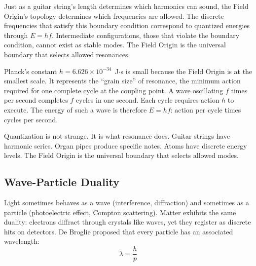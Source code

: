 \documentclass[aps,prd,preprint,superscriptaddress,showpacs,preprintnumbers,amsmath,amssymb,nofootinbib]{revtex4-2}
\begin{document}
Just as a guitar string's length determines which harmonics can sound, the Field Origin's topology determines which frequencies are allowed. The discrete frequencies that satisfy this boundary condition correspond to quantized energies through $E = hf$. Intermediate configurations, those that violate the boundary condition, cannot exist as stable modes. The Field Origin is the universal boundary that selects allowed resonances.

\vspace{1.5em}
\noindent
{}
\vspace{1cm}

Planck's constant $h = 6.626 \times 10^{-34}$~J$\cdot$s is small because the Field Origin is at the smallest scale. It represents the ``grain size'' of resonance, the minimum action required for one complete cycle at the coupling point. A wave oscillating $f$ times per second completes $f$ cycles in one second. Each cycle requires action $h$ to execute. The energy of such a wave is therefore $E = hf$: action per cycle times cycles per second.

Quantization is not strange. It is what resonance does. Guitar strings have harmonic series. Organ pipes produce specific notes. Atoms have discrete energy levels. The Field Origin is the universal boundary that selects allowed modes.

\subsection{Wave-Particle Duality}
\label{subsec:debroglie}

Light sometimes behaves as a wave (interference, diffraction) and sometimes as a particle (photoelectric effect, Compton scattering). Matter exhibits the same duality: electrons diffract through crystals like waves, yet they register as discrete hits on detectors. De Broglie proposed that every particle has an associated wavelength:
\begin{equation}
\lambda = \frac{h}{p}
\end{equation}
\end{document}
